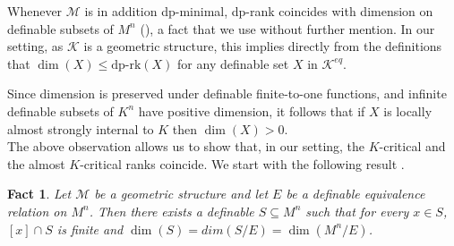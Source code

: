 \documentclass[11pt]{amsart}
\newtheorem{fact}[theorem]{Fact}
\theoremstyle{definition}
\newcommand{\CK}{{\mathcal K}}
\newcommand{\CM}{{\mathcal M}}
\newcommand{\0}{\emptyset}
\def\dpr{\mathrm{dp\text{-}rk}}
\def\sub{\subseteq}
\begin{document}
Whenever $\CM$ is in addition dp-minimal, dp-rank coincides with dimension on  definable subsets of $M^n$  (\cite[Theorem 0.3]{Simdp}), a fact that we use without further mention. In our setting, as $\CK$ is a geometric structure, this implies directly from the definitions that $\dim(X)\leq \dpr(X)$ for any definable set $X$ in $\CK^{eq}$.  

Since dimension is preserved under definable finite-to-one functions, and infinite definable subsets of $K^n$ have positive dimension, it follows that if $X$ is locally almost strongly internal to $K$ then $\dim(X)>0$. \\

The above observation allows us to show that, in our setting, the $K$-critical and the almost $K$-critical ranks coincide. 
We start with the following result \cite[Lemma 3.8]{PePiSt}.

\begin{fact}
    \label{lemma1.1}
Let $\CM$ be a geometric structure and let $E$ be a definable equivalence relation on $M^n$. Then there exists a definable $S\sub M^n$ such that for every $x\in S$, $[x]\cap S$ is finite and $\dim(S)=dim(S/E)=\dim(M^n/E)$.
\end{fact}
\end{document}
